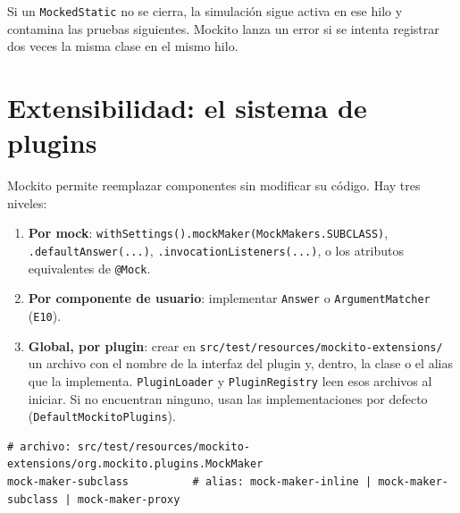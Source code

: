 \documentclass[11pt,a4paper,oneside]{report}
\newcommand{\code}[1]{\texttt{#1}}
\begin{document}
\begin{atencion}
Si un \code{MockedStatic} no se cierra, la simulación sigue activa en ese hilo y contamina las pruebas siguientes. Mockito lanza un error si se intenta registrar dos veces la misma clase en el mismo hilo.
\end{atencion}

\section{Extensibilidad: el sistema de plugins}
Mockito permite reemplazar componentes sin modificar su código. Hay tres niveles:

\begin{enumerate}
  \item \textbf{Por mock}: \code{withSettings().mockMaker(MockMakers.SUBCLASS)}, \code{.defaultAnswer(...)}, \code{.invocationListeners(...)}, o los atributos equivalentes de \code{@Mock}.
  \item \textbf{Por componente de usuario}: implementar \code{Answer} o \code{ArgumentMatcher} (\code{E10}).
  \item \textbf{Global, por plugin}: crear en \code{src/test/resources/mockito-extensions/} un archivo con el nombre de la interfaz del plugin y, dentro, la clase o el alias que la implementa. \code{PluginLoader} y \code{PluginRegistry} leen esos archivos al iniciar. Si no encuentran ninguno, usan las implementaciones por defecto (\code{DefaultMockitoPlugins}).
\end{enumerate}

\begin{lstlisting}[style=bash,caption={Cambiar globalmente el \code{MockMaker} mediante el sistema de plugins}]
# archivo: src/test/resources/mockito-extensions/org.mockito.plugins.MockMaker
mock-maker-subclass          # alias: mock-maker-inline | mock-maker-subclass | mock-maker-proxy
\end{lstlisting}
\end{document}

